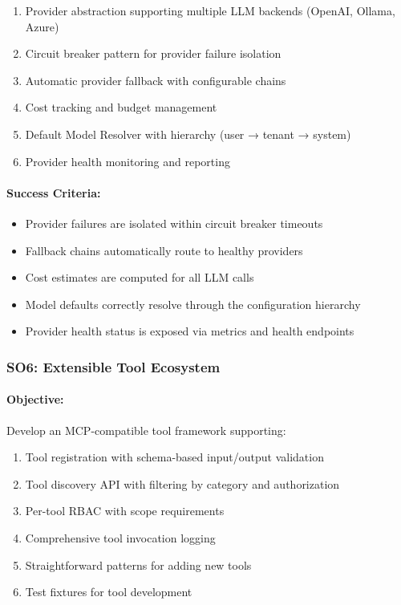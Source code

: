 \begin{enumerate}[label=\alph*)]
    \item Provider abstraction supporting multiple LLM backends (OpenAI, Ollama, Azure)
    \item Circuit breaker pattern for provider failure isolation
    \item Automatic provider fallback with configurable chains
    \item Cost tracking and budget management
    \item Default Model Resolver with hierarchy (user → tenant → system)
    \item Provider health monitoring and reporting
\end{enumerate}

\paragraph{Success Criteria:}
\begin{itemize}
    \item Provider failures are isolated within circuit breaker timeouts
    \item Fallback chains automatically route to healthy providers
    \item Cost estimates are computed for all LLM calls
    \item Model defaults correctly resolve through the configuration hierarchy
    \item Provider health status is exposed via metrics and health endpoints
\end{itemize}

\subsubsection{SO6: Extensible Tool Ecosystem}

\paragraph{Objective:} Develop an MCP-compatible tool framework supporting:

\begin{enumerate}[label=\alph*)]
    \item Tool registration with schema-based input/output validation
    \item Tool discovery API with filtering by category and authorization
    \item Per-tool RBAC with scope requirements
    \item Comprehensive tool invocation logging
    \item Straightforward patterns for adding new tools
    \item Test fixtures for tool development
\end{enumerate}

